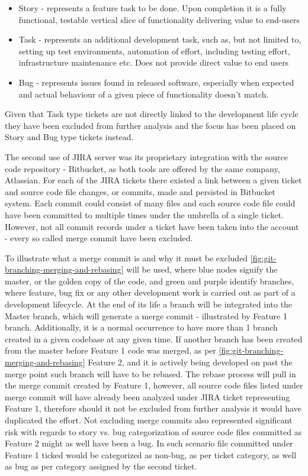 \begin{itemize}
    \item Story - represents a feature task to be done. Upon completion it is a fully functional, testable vertical slice of functionality delivering value to end-users
    \item Task - represents an additional development task, such as, but not limited to, setting up test environments, automation of effort, including testing effort, infrastructure maintenance etc. Does not provide direct value to end users
    \item Bug - represents issues found in released software, especially when expected and actual behaviour of a given piece of functionality doesn't match.
\end{itemize}
Given that Task type tickets are not directly linked to the development life cycle they have been excluded from further analysis and the focus has been placed on Story and Bug type tickets instead.

The second use of JIRA server was its proprietary integration with the source code repository - Bitbucket, as both tools are offered by the same company, Atlassian. For each of the JIRA tickets there existed a link between a given ticket and source code file changes, or commits, made and persisted in Bitbucket system. 
Each commit could consist of many files and each source code file could have been committed to multiple times under the umbrella of a single ticket. However, not all commit records under a ticket have been taken into the account - every so called merge commit have been excluded.

To illustrate what a merge commit is and why it must be excluded \ref{fig:git-branching-merging-and-rebasing} will be used, where blue nodes signify the master, or the golden copy of the code, and green and purple identify branches, where feature, bug fix or any other development work is carried out as part of a development lifecycle. At the end of its life a branch will be integrated into the Master branch, which will generate a merge commit - illustrated by Feature 1 branch. Additionally, it is a normal occurrence to have more than 1 branch created in a given codebase at any given time. If another branch has been created from the master before Feature 1 code was merged, as per \ref{fig:git-branching-merging-and-rebasing} Feature 2, and it is actively being developed on past the merge point such branch will have to be rebased. The rebase process will pull in the merge commit created by Feature 1, however, all source code files listed under merge commit will have already been analyzed under JIRA ticket representing Feature 1, therefore should it not be excluded from further analysis it would have duplicated the effort. Not excluding merge commits also represented significant risk with regards to story vs. bug categorization of source code files committed as Feature 2 might as well have been a bug. In such scenario file committed under Feature 1 ticked would be categorized as non-bug, as per ticket category, as well as bug as per category assigned by the second ticket.

